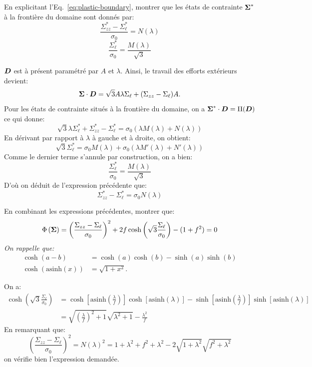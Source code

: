 \documentclass[french,12pt]{exam}
\begin{document}
\begin{questions}
\question En explicitant l'Eq.~\eqref{eq:plastic-boundary}, montrer que les états de contrainte $\boldsymbol{\Sigma}^*$ à la frontière du domaine sont donnés par:
  \begin{equation}
    \frac{\Sigma_{zz}^* - \Sigma_\ell^*}{\sigma_0} = N(\lambda)
\end{equation}  
    \begin{equation}
    \frac{\Sigma_\ell^*}{\sigma_0} = \frac{M(\lambda)}{\sqrt{3}}
\end{equation}  
\begin{solution}
$\boldsymbol{D}$ est à présent paramétré par $A$ et $\lambda$. Ainsi, le travail des efforts extérieurs devient:
$$\boldsymbol{\Sigma} \cdot \boldsymbol{D} = \sqrt{3}A\lambda\Sigma_\ell + (\Sigma_{zz}-\Sigma_\ell)A.$$
Pour les états de contrainte situés à la frontière du domaine, on a $\boldsymbol{\Sigma}^* \cdot \boldsymbol{D} = \Pi(\boldsymbol{D})$ ce qui donne:
$$  \sqrt{3}\lambda\Sigma_\ell^* + \Sigma_{zz}^*-\Sigma_\ell^* = \sigma_0 \left(\lambda M(\lambda)+N(\lambda)\right)$$
En dérivant par rapport à $\lambda$ à gauche et à droite, on obtient:
$$ \sqrt{3}\Sigma_\ell^* = \sigma_0 M(\lambda)+ \sigma_0(\lambda M'(\lambda)+N'(\lambda))$$
Comme le dernier terme s'annule par construction, on a bien:
$$\frac{\Sigma_\ell^*}{\sigma_0} = \frac{M(\lambda)}{\sqrt{3}}$$
D'où on déduit de l'expression précédente que:
$$\Sigma_{zz}^*-\Sigma_\ell^* = \sigma_0 N(\lambda)$$
\end{solution}
  
\question En combinant les expressions précédentes, montrer que:
  \begin{equation}
   \Phi\left( \boldsymbol{\Sigma}     \right)  = \left(  \frac{\Sigma_{zz} - \Sigma_\ell}{\sigma_0} \right)^2 + 2f \cosh{\left(  \sqrt{3} \frac{\Sigma_\ell}{\sigma_0} \right)} - (1 + f^2) = 0
\label{eq4}
  \end{equation}  
  \textit{On rappelle que: 
  \begin{align*}
  \cosh(a-b)&=\cosh(a)\cosh(b)-\sinh(a)\sinh(b) \\
  \cosh(\mathrm{asinh}(x)) &= \sqrt{1+x^2}.
  \end{align*}}
\begin{solution}
On a:
\begin{align*}
\cosh{\left(  \sqrt{3} \frac{\Sigma_\ell}{\sigma_0} \right)} &= \cosh{\left[\mathrm{asinh}{\left( \frac{\lambda}{f} \right)}\right]}\cosh[\mathrm{asinh}{(\lambda)}] - \sinh{\left[\mathrm{asinh}{\left( \frac{\lambda}{f} \right)}\right]}\sinh[\mathrm{asinh}{(\lambda)}]\\
&= \sqrt{\left(\frac{\lambda}{f} \right)^2+1}\sqrt{\lambda^2+1} - \frac{\lambda^2}{f}
\end{align*}
En remarquant que:
$$\left(  \frac{\Sigma_{zz} - \Sigma_\ell}{\sigma_0} \right)^2 = N(\lambda)^2 = 1+\lambda^2+f^2+\lambda^2 -2\sqrt{1+\lambda^2}\sqrt{f^2+\lambda^2}$$
on vérifie bien l'expression demandée.\\


\end{solution}
\end{questions}
\end{document}
